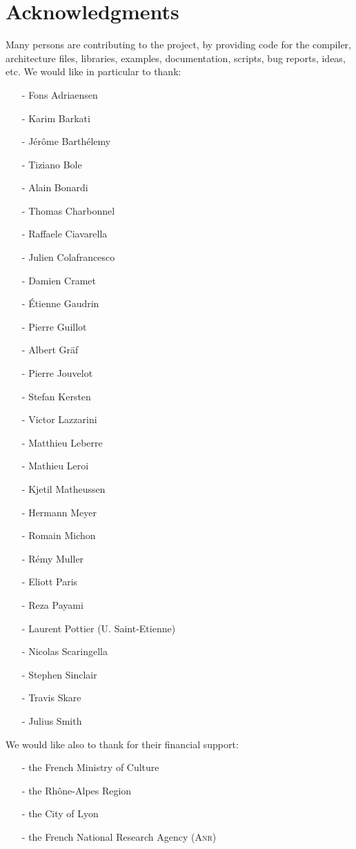 \chapter{Acknowledgments}
Many persons are contributing to the \faust project, by providing code for the compiler, architecture files, libraries, examples, documentation, scripts, bug reports, ideas, etc. We would like in particular to thank:

\begin{itemize}
\item[-]Fons Adriaensen	
\item[-]Karim Barkati
\item[-]J\'er\^ome Barth\'elemy
\item[-]Tiziano Bole	
\item[-]Alain Bonardi
\item[-]Thomas Charbonnel
\item[-]Raffaele Ciavarella
\item[-]Julien Colafrancesco
\item[-]Damien Cramet
\item[-]\'Etienne Gaudrin
\item[-]Pierre Guillot
\item[-]Albert Gr\"af
\item[-]Pierre Jouvelot
\item[-]Stefan Kersten
\item[-]Victor Lazzarini
\item[-]Matthieu Leberre
\item[-]Mathieu Leroi
\item[-]Kjetil Matheussen
\item[-]Hermann Meyer
\item[-]Romain Michon
\item[-]R\'emy Muller
\item[-]Eliott Paris
\item[-]Reza Payami
\item[-]Laurent Pottier (U. Saint-Etienne)
\item[-]Nicolas Scaringella
\item[-]Stephen Sinclair
\item[-]Travis Skare
\item[-]Julius Smith
\end{itemize}


We would like also to thank for their financial support:
\begin{itemize}
\item[-]the French Ministry of Culture
\item[-]the Rh\^one-Alpes Region
\item[-]the City of Lyon
\item[-]the French National Research Agency (\textsc{Anr})
\end{itemize}


